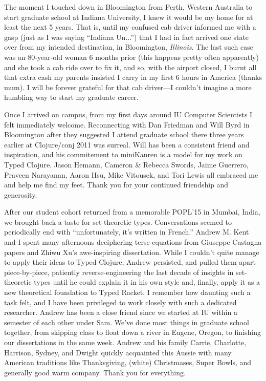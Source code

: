 The moment I touched down in Bloomington from Perth, Western Australia
to start graduate school at Indiana University,
I knew it would be my home for at least the next 5 years.
That is, until my confused cab driver informed me with a gasp
(just as I was saying ``Indiana Un...'') that I had in fact arrived one
state over from my intended destination, in Bloomington, \emph{Illinois}.
The last such case was an 80-year-old woman 6 months prior (this happens pretty often apparently)
and she took a cab ride over to fix it, and so, with the airport closed,
I burnt all that extra cash my parents insisted I carry in my first
6 hours in America (thanks mum).
I will be forever grateful for that cab driver---I couldn't imagine a more
humbling way to start my graduate career.

Once I arrived on campus, from my first days around IU Computer Scientists
I felt immediately welcome.
Reconnecting with Dan Friedman and Will Byrd in Bloomington after they suggested
I attend graduate school there three years earlier at Clojure/conj 2011 was surreal.
Will has been a consistent friend and inspiration, and his commitement
to miniKanren is a model for my work on Typed Clojure.
Jason Hemann, Cameron \& Rebecca Swords, Jaime Guerrero, Praveen Narayanan, Aaron Hsu,
Mike Vitousek, and Tori Lewis all embraced me and help me find my feet. Thank you
for your continued friendship and generosity.

After our student cohort returned from a memorable POPL'15
in Mumbai, India, we brought back a taste for set-theoretic
types. Conversations seemed to periodically end with ``unfortunately, it's written in French.''
Andrew M. Kent and I spent many afternoons deciphering 
terse equations from Giuseppe Castagna papers and
Zhiwu Xu's awe-inspiring dissertation.
While I couldn't quite manage to apply their ideas to Typed Clojure,
Andrew persisted, and pulled them apart piece-by-piece, patiently
reverse-engineering the last decade of insights in
set-theoretic types until he could explain it
in his own style and, finally, apply it as a new theoretical foundation
to Typed Racket. I remember how daunting such a task felt, and
I have been privileged to work closely with such a dedicated
researcher. Andrew has been a close friend since we started
at IU within a semester of each other under Sam. We've done most things
in graduate school together, from skipping class to float down a river in Eugene, Oregon,
to finishing our dissertations in the same week.
Andrew and his family Carrie, Charlotte, Harrison, Sydney, and Dwight
quickly acquainted this Aussie with many American traditions like Thanksgiving,
(white) Christmases, Super Bowls, and generally good warm company. Thank you
for everything.

